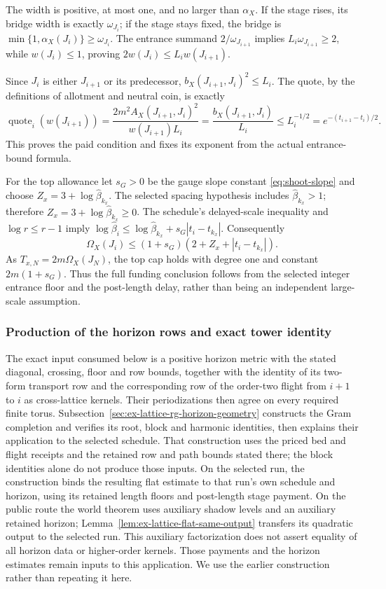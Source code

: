 The width is positive, at most one, and no larger than $\alpha_X$. If the
stage rises, its bridge width is exactly $\omega_{J_i}$; if the stage stays
fixed, the bridge is $\min\{1,\alpha_X(J_i)\}\geq\omega_{J_i}$. The
entrance summand $2/\omega_{J_{i+1}}$ implies
$L_i\omega_{J_{i+1}}\geq2$, while $w(J_i)\leq1$, proving
$2w(J_i)\leq L_iw(J_{i+1})$.

Since $J_i$ is either $J_{i+1}$ or its predecessor,
$b_X(J_{i+1},J_i)^2\leq L_i$. The quote, by the definitions of allotment
and neutral coin, is exactly
\[
 \operatorname{quote}_i(w(J_{i+1}))
 =\frac{2m^2A_X(J_{i+1},J_i)^2}{w(J_{i+1})L_i}
 =\frac{b_X(J_{i+1},J_i)}{L_i}
 \leq L_i^{-1/2}
 =e^{-(t_{i+1}-t_i)/2}.
\]
This proves the paid condition and fixes its exponent from the actual
entrance-bound formula.

For the top allowance let $s_G>0$ be the gauge slope constant
\eqref{eq:shoot-slope} and choose
$Z_x=3+\log\widehat\beta_{k_x}$. The selected spacing hypothesis includes $\widehat\beta_{k_x}>1$;
therefore $Z_x=3+\log\widehat\beta_{k_x}\geq0$. The schedule's
delayed-scale inequality and $\log r\leq r-1$ imply
$\log\widehat\beta_i\leq\log\widehat\beta_{k_x}
+s_G|t_i-t_{k_x}|$. Consequently
\[
 \Omega_X(J_i)\leq(1+s_G)(2+Z_x+|t_i-t_{k_x}|).
\]
As $T_{x,N}=2m\Omega_X(J_N)$, the top cap holds with degree one and
constant $2m(1+s_G)$. Thus the full funding conclusion follows from
the selected integer entrance floor and the post-length delay, rather than
being an independent large-scale assumption.

\subsubsection{Production of the horizon rows and exact tower identity}
\label{subsec:ex-lattice-rg-horizon-producer}

The exact input consumed below is a positive horizon metric with the stated
diagonal, crossing, floor and row bounds, together with the identity of its
two-form transport row and the corresponding row of the order-two flight
from $i+1$ to $i$ as cross-lattice kernels. Their periodizations then agree
on every required finite torus.
Subsection~\ref{sec:ex-lattice-rg-horizon-geometry} constructs
the Gram completion and verifies its root, block and harmonic identities,
then explains their application to the selected schedule. That construction
uses the priced bed and flight receipts and the retained row and path bounds
stated there; the block identities alone do not produce those inputs. On the
selected run, the construction binds the resulting flat estimate to that
run's own schedule and horizon, using its retained length floors and
post-length stage payment. On the public route the world theorem uses auxiliary shadow levels and an auxiliary retained horizon; Lemma~\ref{lem:ex-lattice-flat-same-output} transfers its quadratic output to the selected run. This auxiliary factorization does not assert equality of all
horizon data or higher-order kernels. Those payments and the horizon
estimates remain inputs to this application. We use the earlier construction
rather than repeating it here.
